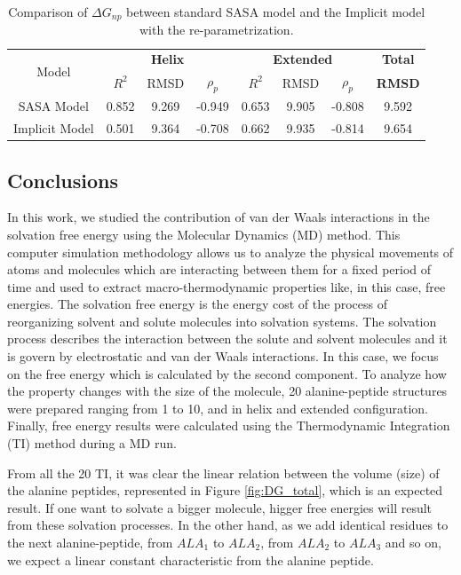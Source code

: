 \begin{table}[th] %
    \centering
    \begin{tabular}{c|ccc|ccc|c}
    \toprule
    \multirow{2}{4em}{Model}           &   \multicolumn{3}{c|}{\textbf{Helix}} & \multicolumn{3}{c}{\textbf{Extended}}&\textbf{Total}\\

    &   $R^2$ & RMSD   &   $\rho_p $ &  $R^2$ & RMSD   &   $\rho_p $ & \textbf{RMSD}\\
    \midrule
    SASA Model & 0.852 & 9.269 & -0.949 & 0.653 & 9.905 & -0.808 & 9.592\\
    Implicit Model & 0.501 & 9.364 & -0.708 & 0.662 & 9.935 & -0.814 & 9.654\\      
    \bottomrule
    \end{tabular}
    \caption{Comparison of $\Delta G_{np}$ between standard SASA model and the Implicit model with the re-parametrization.}
    \label{table:measures_2}
\end{table}     

\subsection{Conclusions}

In this work, we studied the contribution of van der Waals interactions in the solvation free energy using the Molecular Dynamics (MD) method. This computer simulation methodology allows us to analyze the physical movements of atoms and molecules which are interacting between them for a fixed period of time and used to extract macro-thermodynamic properties like, in this case, free energies. 
The solvation free energy is the energy cost of the process of reorganizing solvent and solute molecules into solvation systems. The solvation process describes the interaction between the solute and solvent molecules and it is govern by electrostatic and van der Waals interactions. In this case, we focus on the free energy which is calculated by the second component. 
To analyze how the property changes with the size of the molecule, 20 alanine-peptide structures were prepared ranging from 1 to 10, and in helix and extended configuration. Finally, free energy results were calculated using the Thermodynamic Integration (TI) method during a MD run. 

From all the 20 TI, it was clear the linear relation between the volume (size) of the alanine peptides, represented in Figure \ref{fig:DG_total}, which is an expected result. If one want to solvate a bigger molecule, higger free energies will result from these solvation processes. In the other hand, as we add identical residues to the next alanine-peptide, from $ALA_1$ to $ALA_2$, from $ALA_2$ to $ALA_3$ and so on, we expect a linear constant characteristic from the alanine peptide. 

